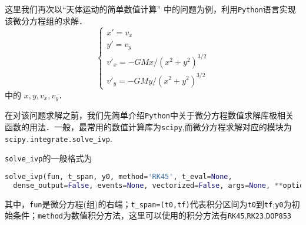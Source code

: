 这里我们再次以“天体运动的简单数值计算” 中的问题为例，利用\verb |Python|语言实现该微分方程组的求解．
\begin{equation}\label{PyIVP_eq}
\begin{cases}
x' = v_x\\
y' = v_y\\
v'_x = -GMx/(x^2 + y^2)^{3/2}\\
v'_y = -GMy/(x^2 + y^2)^{3/2}
\end{cases}
\end{equation}
中的 $x, y, v_x, v_y$．

在对该问题求解之前，我们先简单介绍\verb|Python|中关于微分方程数值求解库极相关函数的用法．一般，最常用的数值计算库为\verb|scipy|,而微分方程求解对应的模块为\verb|scipy.integrate.solve_ivp|.

 \verb|solve_ivp|的一般格式为
 \begin{lstlisting}[language=python]
 solve_ivp(fun, t_span, y0, method='RK45', t_eval=None,
  dense_output=False, events=None, vectorized=False, args=None, **options)
 \end{lstlisting}
 其中，\verb|fun|是微分方程(组)的右端；\verb|t_span=(t0,tf)|代表积分区间为\verb|t0|到\verb|tf|;\verb|y0|为初始条件；\verb|method|为数值积分方法，这里可以使用的积分方法有\verb|RK45|,\verb|RK23|,\verb|DOP853|